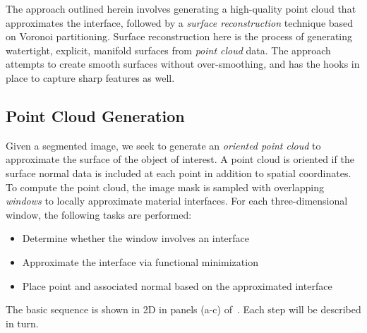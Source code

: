 The approach outlined herein involves generating a high-quality point cloud that approximates the interface, followed by a  \textit{surface reconstruction} technique based on Voronoi partitioning. Surface reconstruction here is the process of generating watertight, explicit, manifold surfaces from \textit{point cloud} data. The approach attempts to create smooth surfaces without over-smoothing, and has the hooks in place to capture sharp features as well.

\subsection{Point Cloud Generation}
\label{Point Cloud Generation}

Given a segmented image, we seek to generate an \textit{oriented point cloud} to approximate the surface of the object of interest. A point cloud is oriented if the surface normal data is included at each point in addition to spatial coordinates. To compute the point cloud, the image mask is sampled with overlapping \textit{windows} to locally approximate material interfaces. For each three-dimensional window, the following tasks are performed:
\begin{itemize}[noitemsep]
  \item Determine whether the window involves an interface
  \item Approximate the interface via functional minimization
  \item Place point and associated normal based on the approximated interface
\end{itemize}
The basic sequence is shown in 2D in panels (a-c) of~. Each step will be described in turn.

